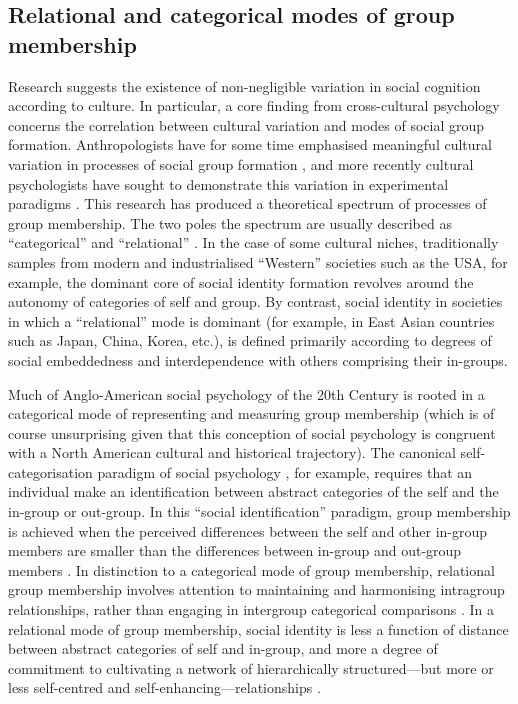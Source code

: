 \begin{CJK}{UTF8}{gbsn}
\subsection{Relational and categorical modes of group membership}

Research suggests the existence of non-negligible variation in social cognition according to culture.  In particular, a core finding from cross-cultural psychology concerns the correlation between cultural variation and modes of social group formation.  Anthropologists have for some time emphasised meaningful cultural variation in processes of social group formation \citep{Strodtbeck1961,Kluckhohn1961,Mead1967,Fei1992}, and more recently cultural psychologists have sought to demonstrate this variation in experimental paradigms \citep{Markus1991,Nisbett2001}.
This research has produced a theoretical spectrum of processes of group membership. The two poles the spectrum are usually described as ``categorical'' and ``relational'' \citep{Hofstede1980,Brewer2007}.  In the case of some cultural niches, traditionally samples from modern and industrialised ``Western'' societies such as the USA, for example, the dominant core of social identity formation revolves around the autonomy of categories of self and group.  By contrast, social identity in societies in which a ``relational'' mode is dominant (for example, in East Asian countries such as Japan, China, Korea, etc.), is defined primarily according to degrees of social embeddedness and interdependence with others comprising their in-groups\citep{Leung2012}.

Much of Anglo-American social psychology of the 20th Century is rooted in a categorical mode of representing and measuring group membership (which is of course unsurprising given that this conception of social psychology is congruent with a North American cultural and historical trajectory).  The canonical self-categorisation paradigm of social psychology \citep{Turner1987}, for example, requires that an individual make an identification between abstract categories of the self and the in-group or out-group. In this ``social identification'' paradigm, group membership is achieved when the perceived differences between the self and other in-group members are smaller than the differences between in-group and out-group members \citep{Yuki2014}.  In distinction to a categorical mode of group membership, relational group membership involves attention to maintaining and harmonising intragroup relationships, rather than engaging in intergroup categorical comparisons \citep{Yuki2003}.  In a relational mode of group membership, social identity is less a function of distance between abstract categories of self and in-group, and more a degree of commitment to cultivating a network of hierarchically structured---but more or less self-centred and self-enhancing---relationships \citep{Liu2009,Nisbett2003}.


\end{CJK}
